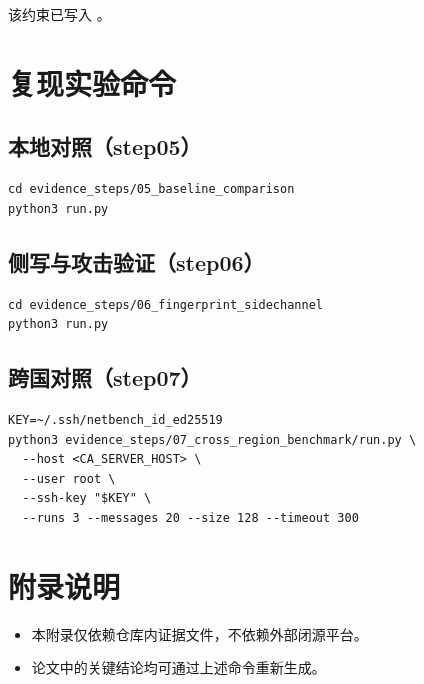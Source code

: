 该约束已写入 。

\section{复现实验命令}
\subsection{本地对照（step05）}
\begin{verbatim}
cd evidence_steps/05_baseline_comparison
python3 run.py
\end{verbatim}

\subsection{侧写与攻击验证（step06）}
\begin{verbatim}
cd evidence_steps/06_fingerprint_sidechannel
python3 run.py
\end{verbatim}

\subsection{跨国对照（step07）}
\begin{verbatim}
KEY=~/.ssh/netbench_id_ed25519
python3 evidence_steps/07_cross_region_benchmark/run.py \
  --host <CA_SERVER_HOST> \
  --user root \
  --ssh-key "$KEY" \
  --runs 3 --messages 20 --size 128 --timeout 300
\end{verbatim}

\section{附录说明}
\begin{itemize}
  \item 本附录仅依赖仓库内证据文件，不依赖外部闭源平台。
  \item 论文中的关键结论均可通过上述命令重新生成。
\end{itemize}
